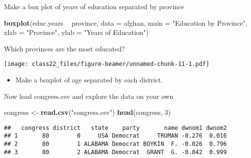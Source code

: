 \documentclass[ignorenonframetext,]{beamer}
\newenvironment{Shaded}{\begin{snugshade}}{\end{snugshade}}
\newcommand{\KeywordTok}[1]{\textcolor[rgb]{0.13,0.29,0.53}{\textbf{#1}}}
\newcommand{\DataTypeTok}[1]{\textcolor[rgb]{0.13,0.29,0.53}{#1}}
\newcommand{\DecValTok}[1]{\textcolor[rgb]{0.00,0.00,0.81}{#1}}
\newcommand{\StringTok}[1]{\textcolor[rgb]{0.31,0.60,0.02}{#1}}
\newcommand{\OperatorTok}[1]{\textcolor[rgb]{0.81,0.36,0.00}{\textbf{#1}}}
\newcommand{\NormalTok}[1]{#1}
\providecommand{\tightlist}{%
	\setlength{\itemsep}{0pt}\setlength{\parskip}{0pt}}
\begin{document}
\begin{frame}[fragile]{Make a box plot of years of education separated
by province}

\begin{Shaded}
\begin{Highlighting}[]
\KeywordTok{boxplot}\NormalTok{(educ.years }\OperatorTok{~}\StringTok{ }\NormalTok{province, }
        \DataTypeTok{data =}\NormalTok{ afghan, }
        \DataTypeTok{main =} \StringTok{"Education by Province"}\NormalTok{, }
        \DataTypeTok{xlab =} \StringTok{"Province"}\NormalTok{,}
        \DataTypeTok{ylab =} \StringTok{"Years of Education"}\NormalTok{)}
\end{Highlighting}
\end{Shaded}

\end{frame}

\begin{frame}{Which provinces are the most educated?}

\texttt{[image: class22\_files/figure-beamer/unnamed-chunk-11-1.pdf]}

\begin{itemize}
\tightlist
\item
  Make a boxplot of age separated by each district.
\end{itemize}

\end{frame}

\begin{frame}[fragile]{Now load congress.csv and explore the data on
your own}

\begin{Shaded}
\begin{Highlighting}[]
\NormalTok{congress <-}\StringTok{ }\KeywordTok{read.csv}\NormalTok{(}\StringTok{"congress.csv"}\NormalTok{)}
\KeywordTok{head}\NormalTok{(congress, }\DecValTok{3}\NormalTok{)}
\end{Highlighting}
\end{Shaded}

\begin{verbatim}
##   congress district   state    party       name dwnom1 dwnom2
## 1       80        0     USA Democrat     TRUMAN -0.276  0.016
## 2       80        1 ALABAMA Democrat BOYKIN  F. -0.026  0.796
## 3       80        2 ALABAMA Democrat  GRANT  G. -0.042  0.999
\end{verbatim}

\end{frame}
\end{document}
